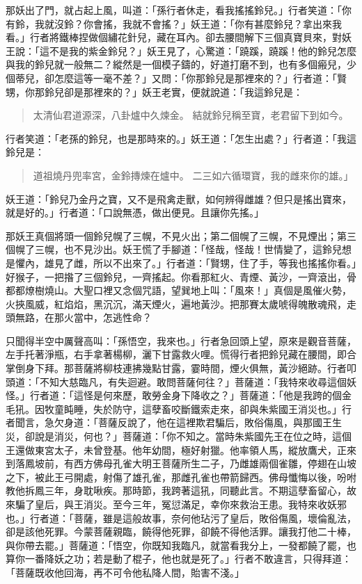 那妖出了門，就占起上風，叫道：「孫行者休走，看我搖搖鈴兒。」行者笑道：「你有鈴，我就沒鈴？你會搖，我就不會搖？」妖王道：「你有甚麼鈴兒？拿出來我看。」行者將鐵棒捏做個繡花針兒，藏在耳內。卻去腰間解下三個真寶貝來，對妖王說：「這不是我的紫金鈴兒？」妖王見了，心驚道：「蹺蹊，蹺蹊！他的鈴兒怎麼與我的鈴兒就一般無二？縱然是一個模子鑄的，好道打磨不到，也有多個瘢兒，少個蒂兒，卻怎麼這等一毫不差？」又問：「你那鈴兒是那裡來的？」行者道：「賢甥，你那鈴兒卻是那裡來的？」妖王老實，便就說道：「我這鈴兒是：
\begin{quote}
太清仙君道源深，八卦爐中久煉金。
結就鈴兒稱至寶，老君留下到如今。
\end{quote}

行者笑道：「老孫的鈴兒，也是那時來的。」妖王道：「怎生出處？」行者道：「我這鈴兒是：
\begin{quote}
道祖燒丹兜率宮，金鈴摶煉在爐中。
二三如六循環寶，我的雌來你的雄。」
\end{quote}

妖王道：「鈴兒乃金丹之寶，又不是飛禽走獸，如何辨得雌雄？但只是搖出寶來，就是好的。」行者道：「口說無憑，做出便見。且讓你先搖。」

那妖王真個將頭一個鈴兒幌了三幌，不見火出；第二個幌了三幌，不見煙出；第三個幌了三幌，也不見沙出。妖王慌了手腳道：「怪哉，怪哉！世情變了，這鈴兒想是懼內，雄見了雌，所以不出來了。」行者道：「賢甥，住了手，等我也搖搖你看。」好猴子，一把揝了三個鈴兒，一齊搖起。你看那紅火、青煙、黃沙，一齊滾出，骨都都燎樹燒山。大聖口裡又念個咒語，望巽地上叫：「風來！」真個是風催火勢，火挾風威，紅焰焰，黑沉沉，滿天煙火，遍地黃沙。把那賽太歲唬得魄散魂飛，走頭無路，在那火當中，怎逃性命？

只聞得半空中厲聲高叫：「孫悟空，我來也。」行者急回頭上望，原來是觀音菩薩，左手托著淨瓶，右手拿著楊柳，灑下甘露救火哩。慌得行者把鈴兒藏在腰間，即合掌倒身下拜。那菩薩將柳枝連拂幾點甘露，霎時間，煙火俱無，黃沙絕跡。行者叩頭道：「不知大慈臨凡，有失迴避。敢問菩薩何往？」菩薩道：「我特來收尋這個妖怪。」行者道：「這怪是何來歷，敢勞金身下降收之？」菩薩道：「他是我跨的個金毛犼。因牧童盹睡，失於防守，這孽畜咬斷鐵索走來，卻與朱紫國王消災也。」行者聞言，急欠身道：「菩薩反說了，他在這裡欺君騙后，敗俗傷風，與那國王生災，卻說是消災，何也？」菩薩道：「你不知之。當時朱紫國先王在位之時，這個王還做東宮太子，未曾登基。他年幼間，極好射獵。他率領人馬，縱放鷹犬，正來到落鳳坡前，有西方佛母孔雀大明王菩薩所生二子，乃雌雄兩個雀雛，停翅在山坡之下，被此王弓開處，射傷了雄孔雀，那雌孔雀也帶箭歸西。佛母懺悔以後，吩咐教他拆鳳三年，身耽啾疾。那時節，我跨著這犼，同聽此言。不期這孽畜留心，故來騙了皇后，與王消災。至今三年，冤愆滿足，幸你來救治王患。我特來收妖邪也。」行者道：「菩薩，雖是這般故事，奈何他玷污了皇后，敗俗傷風，壞倫亂法，卻是該他死罪。今蒙菩薩親臨，饒得他死罪，卻饒不得他活罪。讓我打他二十棒，與你帶去罷。」菩薩道：「悟空，你既知我臨凡，就當看我分上，一發都饒了罷，也算你一番降妖之功；若是動了棍子，他也就是死了。」行者不敢違言，只得拜道：「菩薩既收他回海，再不可令他私降人間，貽害不淺。」

